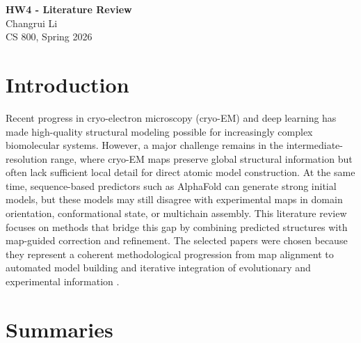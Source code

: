 \documentclass[12pt]{article}
\begin{document}
\begin{centering}
{\large\textbf{HW4 - Literature Review}}\\
\vspace{3mm} %
Changrui Li\\
CS 800, Spring 2026\\
\end{centering}



\section{Introduction}

Recent progress in cryo-electron microscopy (cryo-EM) and deep learning has made high-quality structural modeling possible for increasingly complex biomolecular systems. However, a major challenge remains in the intermediate-resolution range, where cryo-EM maps preserve global structural information but often lack sufficient local detail for direct atomic model construction. At the same time, sequence-based predictors such as AlphaFold can generate strong initial models, but these models may still disagree with experimental maps in domain orientation, conformational state, or multichain assembly. This literature review focuses on methods that bridge this gap by combining predicted structures with map-guided correction and refinement. The selected papers were chosen because they represent a coherent methodological progression from map alignment to automated model building and iterative integration of evolutionary and experimental information \cite{han2021vesper,he2022embuild,wang2024diffmodeler,chen2026cryoevobuild,abramson2024alphafold3}.


\section{Summaries}
\end{document}
